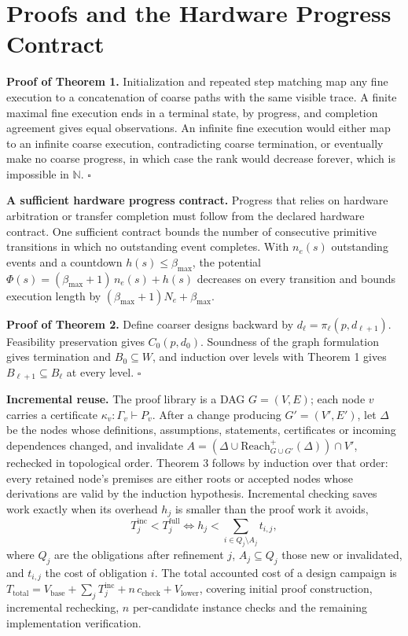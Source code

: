 \documentclass[11pt]{article}
\begin{document}
\section{Proofs and the Hardware Progress Contract}\label{app:proofs}

\textbf{Proof of Theorem 1.} Initialization and repeated step matching map any fine execution to a concatenation of coarse paths with the same visible trace. A finite maximal fine execution ends in a terminal state, by progress, and completion agreement gives equal observations. An infinite fine execution would either map to an infinite coarse execution, contradicting coarse termination, or eventually make no coarse progress, in which case the rank would decrease forever, which is impossible in \(\mathbb N\). \(\square\)

\textbf{A sufficient hardware progress contract.} Progress that relies on hardware arbitration or transfer completion must follow from the declared hardware contract. One sufficient contract bounds the number of consecutive primitive transitions in which no outstanding event completes. With \(n_e(s)\) outstanding events and a countdown \(h(s)\le\beta_{\max}\), the potential \(\Phi(s)=(\beta_{\max}+1)\,n_e(s)+h(s)\) decreases on every transition and bounds execution length by \((\beta_{\max}+1)N_e+\beta_{\max}\).

\textbf{Proof of Theorem 2.} Define coarser designs backward by \(d_\ell=\pi_\ell(p,d_{\ell+1})\). Feasibility preservation gives \(C_0(p,d_0)\). Soundness of the graph formulation gives termination and \(B_0\subseteq W\), and induction over levels with Theorem 1 gives \(B_{\ell+1}\subseteq B_\ell\) at every level. \(\square\)

\textbf{Incremental reuse.} The proof library is a DAG \(G=(V,E)\); each node \(v\) carries a certificate \(\kappa_v:\Gamma_v\vdash P_v\). After a change producing \(G'=(V',E')\), let \(\Delta\) be the nodes whose definitions, assumptions, statements, certificates or incoming dependences changed, and invalidate \(A=(\Delta\cup\mathrm{Reach}^{+}_{G\cup G'}(\Delta))\cap V'\), rechecked in topological order. Theorem 3 follows by induction over that order: every retained node's premises are either roots or accepted nodes whose derivations are valid by the induction hypothesis. Incremental checking saves work exactly when its overhead \(h_j\) is smaller than the proof work it avoids,
\[
T^{\mathrm{inc}}_j<T^{\mathrm{full}}_j\iff h_j<\sum_{i\in Q_j\setminus A_j}t_{i,j},
\]
where \(Q_j\) are the obligations after refinement \(j\), \(A_j\subseteq Q_j\) those new or invalidated, and \(t_{i,j}\) the cost of obligation \(i\). The total accounted cost of a design campaign is \(T_{\mathrm{total}}=V_{\mathrm{base}}+\sum_j T^{\mathrm{inc}}_j+n\,c_{\mathrm{check}}+V_{\mathrm{lower}}\), covering initial proof construction, incremental rechecking, \(n\) per-candidate instance checks and the remaining implementation verification.
\end{document}
